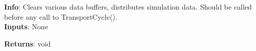 \textbf{Info}: Clears various data buffers, distributes simulation data. Should be
called before any call to TransportCycle(). \\

\noindent \textbf{Inputs}: None

\noindent \textbf{Returns}: void
